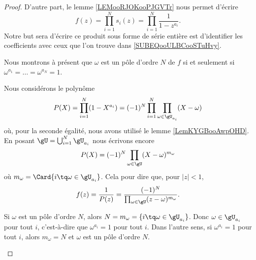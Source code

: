 \begin{proof}
	D'autre part, le lemme \ref{LEMooRJOKooPJGVTr} nous permet d'écrire
	\begin{equation}
		f(z)=\prod_{i=1}^Ns_i(z)=\prod_{i=1}^N\frac{1}{ 1-z^{a_i} }.
	\end{equation}
	Notre but sera d'écrire ce produit sous forme de série entière est d'identifier les coefficients avec ceux que l'on trouve dans \eqref{SUBEQooULBCooSTuHvy}.

	\begin{subproof}
		\spitem[\( m_{\omega}=N\) si et seulement si \( \omega^{a_i}=1\)]
		Nous montrons à présent que \( \omega\) est un pôle d'ordre \( N\) de \( f\) si et seulement si \( \omega^{a_1}=\ldots=\omega^{a_N}=1\).
		\begin{subproof}
			\spitem[Un polynôme]
			Nous considérons le polynôme
			\begin{equation}		\label{EQooFNSMooVDHVnI}
				P(X)=\prod_{i=1}^N(1-X^{a_i})=(-1)^{N}\prod_{i=1}^N\prod_{\omega\in \gU_{a_i}}(X-\omega)
			\end{equation}
			où, pour la seconde égalité, nous avons utilisé le lemme \ref{LemKYGBooAwpOHD}. En posant \( \gU=\bigcup_{i=1}^N\gU_{a_i}\) nous écrivons encore
			\begin{equation}
				P(X)=(-1)^N\prod_{\omega\in \gU}(X-\omega)^{m_{\omega}}
			\end{equation}
			où \( m_{\omega}=\Card\{ i\tq \omega\in \gU_{a_i} \}\). Cela pour dire que, pour \( | z |<1\),
			\begin{equation}
				f(z)=\frac{1}{ P(z) }=\frac{(-1)^N}{ \prod_{\omega\in \gU} (z-\omega)^{m_{\omega}}}.
			\end{equation}

			Si \( \omega\) est un pôle d'ordre \( N\), alors \( N=m_{\omega}=\{ i\tq \omega\in \gU_{a_i} \}\). Donc \( \omega\in \gU_{a_i}\) pour tout \( i\), c'est-à-dire que \( \omega^{a_i}=1\) pour tout \( i\).
			Dans l'autre sens, si \( \omega^{a_i}=1\) pour tout \( i\), alors \( m_{\omega}=N\) et \( \omega\) est un pôle d'ordre \( N\).
		\end{subproof}


\end{subproof}
\end{proof}
